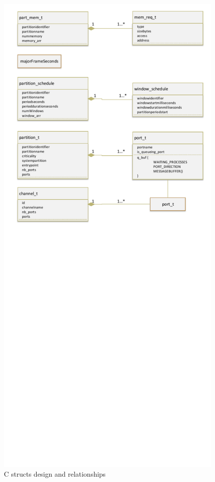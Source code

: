 \begin{figure}[H]	\includegraphics[clip=true,trim=0cm 20cm 0cm 0cm,width=\linewidth,keepaspectratio]{figures/cstructs.pdf}
	\caption{C structs design and relationships}
	\label{fig:cstructs}
\end{figure}

